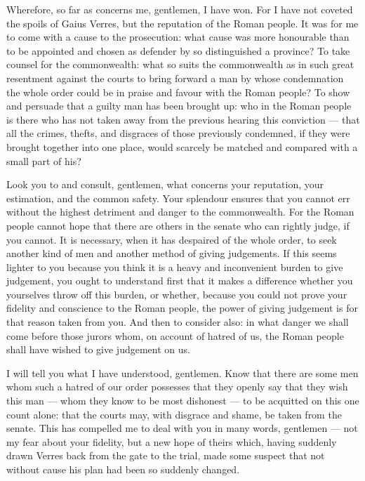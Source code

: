  Wherefore, so far as concerns me, gentlemen, I have won. For I have not coveted the spoils of Gaius Verres, but the reputation of the Roman people. It was for me to come with a cause to the prosecution: what cause was more honourable than to be appointed and chosen as defender by so distinguished a province? To take counsel for the commonwealth: what so suits the commonwealth as in such great resentment against the courts to bring forward a man by whose condemnation the whole order could be in praise and favour with the Roman people? To show and persuade that a guilty man has been brought up: who in the Roman people is there who has not taken away from the previous hearing this conviction --- that all the crimes, thefts, and disgraces of those previously condemned, if they were brought together into one place, would scarcely be matched and compared with a small part of his?

 Look you to and consult, gentlemen, what concerns your reputation, your estimation, and the common safety. Your splendour ensures that you cannot err without the highest detriment and danger to the commonwealth. For the Roman people cannot hope that there are others in the senate who can rightly judge, if you cannot. It is necessary, when it has despaired of the whole order, to seek another kind of men and another method of giving judgements. If this seems lighter to you because you think it is a heavy and inconvenient burden to give judgement, you ought to understand first that it makes a difference whether you yourselves throw off this burden, or whether, because you could not prove your fidelity and conscience to the Roman people, the power of giving judgement is for that reason taken from you. And then to consider also: in what danger we shall come before those jurors whom, on account of hatred of us, the Roman people shall have wished to give judgement on us.

 I will tell you what I have understood, gentlemen. Know that there are some men whom such a hatred of our order possesses that they openly say that they wish this man --- whom they know to be most dishonest --- to be acquitted on this one count alone: that the courts may, with disgrace and shame, be taken from the senate. This has compelled me to deal with you in many words, gentlemen --- not my fear about your fidelity, but a new hope of theirs which, having suddenly drawn Verres back from the gate to the trial, made some suspect that not without cause his plan had been so suddenly changed.

